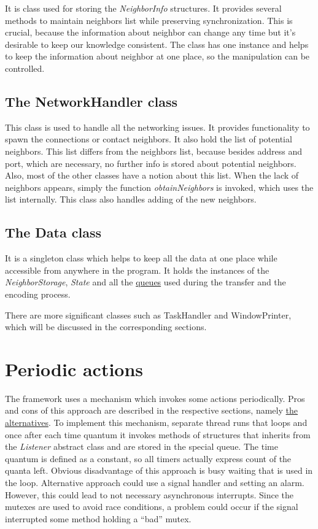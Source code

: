 It is class used for storing the \textit{NeighborInfo} structures. It
provides several methods to maintain neighbors list while preserving
synchronization. This is crucial, because the information about neighbor
can change any time but it's desirable to keep our knowledge consistent.
The class has one instance and helps to keep the information about
neighbor at one place, so the manipulation can be controlled.

\subsection{The NetworkHandler class}\label{the-networkhandler-class}

This class is used to handle all the networking issues. It provides
functionality to spawn the connections or contact neighbors. It also
hold the list of potential neighbors. This list differs from the
neighbors list, because besides address and port, which are necessary,
no further info is stored about potential neighbors. Also, most of the
other classes have a notion about this list. When the lack of neighbors
appears, simply the function \textit{obtainNeighbors} is invoked, which
uses the list internally. This class also handles adding of the new
neighbors.

\subsection{The Data class}\label{the-data-class}

It is a singleton class which helps to keep all the data at one place
while accessible from anywhere in the program. It holds the instances of
the \textit{NeighborStorage}, \textit{State} and all the
\hyperref[queues]{queues} used during the transfer and the encoding
process.

There are more significant classes such as TaskHandler and
WindowPrinter, which will be discussed in the corresponding sections.

\section{Periodic actions}\label{periodic-actions}

The framework uses a mechanism which invokes some actions periodically.
Pros and cons of this approach are described in the respective sections,
namely
\hyperref[problems-alternatives-and-possible-improvements]{the alternatives}.
To implement this mechanism, separate thread runs that loops and once
after each time quantum it invokes methods of structures that inherits
from the \textit{Listener} abstract class and are stored in the special
queue. The time quantum is defined as a constant, so all timers actually
express count of the quanta left. Obvious disadvantage of this approach
is busy waiting that is used in the loop. Alternative approach could use
a signal handler and setting an alarm. However, this could lead to not
necessary asynchronous interrupts. Since the mutexes are used to avoid
race conditions, a problem could occur if the signal interrupted some
method holding a ``bad'' mutex.

